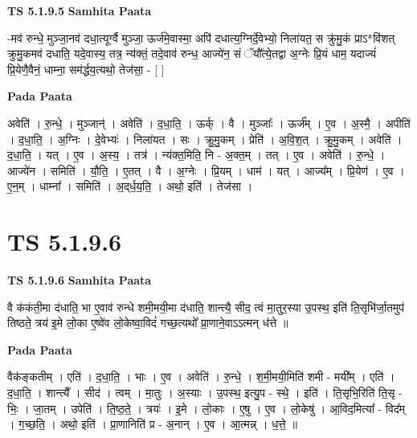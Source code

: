 \documentclass[17pt]{extarticle}
\begin{document}
\textbf{TS 5.1.9.5 } \newline
\textbf{Samhita Paata} \newline

-मव॑ रुन्धे॒ मुञ्जा॒नव॑ दधा॒त्यूर्ग्वै मुञ्जा॒ ऊर्ज॑मे॒वास्मा॒ अपि॑ दधात्य॒ग्निर्दे॒वेभ्यो॒ निला॑यत॒ स क्रु॑मु॒कं प्राऽ*वि॑शत् क्रुमु॒कमव॑ दधाति॒ यदे॒वास्य॒ तत्र॒ न्य॑क्तं॒ तदे॒वाव॑ रुन्ध॒ आज्ये॑न॒ सं ॅयौ᳚त्ये॒तद्वा अ॒ग्नेः प्रि॒यं धाम॒ यदाज्यं॑ प्रि॒येणै॒वैनं॒ धाम्ना॒ सम॑र्द्धय॒त्यथो॒ तेज॑सा॒ - [  ] \newline

\textbf{Pada Paata} \newline

अवेति॑ । रु॒न्धे॒ । मुञ्जान्॑ । अवेति॑ । द॒धा॒ति॒ । ऊर्क् । वै । मुञ्जाः᳚ । ऊर्ज᳚म् । ए॒व । अ॒स्मै॒ । अपीति॑ । द॒धा॒ति॒ । अ॒ग्निः । दे॒वेभ्यः॑ । निला॑यत । सः । क्रु॒मु॒कम् । प्रेति॑ । अ॒वि॒श॒त् । क्रु॒मु॒कम् । अवेति॑ । द॒धा॒ति॒ । यत् । ए॒व । अ॒स्य॒ । तत्र॑ । न्य॑क्त॒मिति॒ नि - अ॒क्त॒म् । तत् । ए॒व । अवेति॑ । रु॒न्धे॒ । आज्ये॑न । समिति॑ । यौ॒ति॒ । ए॒तत् । वै । अ॒ग्नेः । प्रि॒यम् । धाम॑ । यत् । आज्य᳚म् । प्रि॒येण॑ । ए॒व । ए॒न॒म् । धाम्ना᳚ । समिति॑ । अ॒द्‌र्ध॒य॒ति॒ । अथो॒ इति॑ । तेज॑सा ।  \newline





\section{ TS 5.1.9.6 }

\textbf{TS 5.1.9.6 } \newline
\textbf{Samhita Paata} \newline

वै क॑कंती॒मा द॑धाति॒ भा ए॒वाव॑ रुन्धे शमी॒मयी॒मा द॑धाति॒ शान्त्यै॒ सीद॒ त्वं मा॒तुर॒स्या उ॒पस्थ॒ इति॑ ति॒सृभि॑र्जा॒तमुप॑ तिष्ठते॒ त्रय॑ इ॒मे लो॒का ए॒ष्वे॑व लो॒केष्वा॒विदं॑ गच्छ॒त्यथो᳚ प्रा॒णाने॒वाऽऽत्मन् ध॑त्ते ॥ \newline

\textbf{Pada Paata} \newline

वैक॑ङ्कतीम् । एति॑ । द॒धा॒ति॒ । भाः । ए॒व । अवेति॑ । रु॒न्धे॒ । श॒मी॒मयी॒मिति॑ शमी - मयी᳚म् । एति॑ । द॒धा॒ति॒ । शान्त्यै᳚ । सीद॑ । त्वम् । मा॒तुः । अ॒स्याः । उ॒पस्थ॒ इत्यु॒प - स्थे॒ । इति॑ । ति॒सृभि॒रिति॑ ति॒सृ - भिः॒ । जा॒तम् । उपेति॑ । ति॒ष्ठ॒ते॒ । त्रयः॑ । इ॒मे । लो॒काः । ए॒षु । ए॒व । लो॒केषु॑ । आ॒विद॒मित्या᳚ - विद᳚म् । ग॒च्छ॒ति॒ । अथो॒ इति॑ । प्रा॒णानिति॑ प्र - अ॒नान् । ए॒व । आ॒त्मन्न् । ध॒त्ते॒ ॥  \newline
\end{document}
